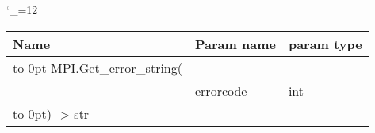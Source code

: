 \begingroup \catcode`\_=12 \tt
\begin{tabular}{lll}
\toprule
\textrm{Name}&\textrm{Param name}&\textrm{param type}\\
\midrule
\hbox to 0pt {MPI.Get_error_string(\hss}\\
& errorcode & int\\
\hbox to 0pt{) -> str\hss}\\
\bottomrule
\end{tabular}
\endgroup
